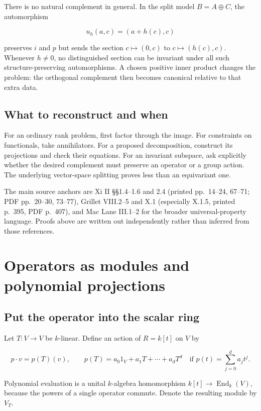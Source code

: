 \documentclass[
  11pt,
]{article}
\begin{document}
There is no natural complement in general. In the split model
\(B=A\oplus C\), the automorphism

\[u_h(a,c)=(a+h(c),c)\]

preserves \(i\) and \(p\) but sends the section \(c\mapsto(0,c)\) to
\(c\mapsto(h(c),c)\). Whenever \(h\ne0\), no distinguished section can
be invariant under all such structure-preserving automorphisms. A chosen
positive inner product changes the problem: the orthogonal complement
then becomes canonical relative to that extra data.

\subsection{What to reconstruct and
when}\label{what-to-reconstruct-and-when}

For an ordinary rank problem, first factor through the image. For
constraints on functionals, take annihilators. For a proposed
decomposition, construct its projections and check their equations. For
an invariant subspace, ask explicitly whether the desired complement
must preserve an operator or a group action. The underlying vector-space
splitting proves less than an equivariant one.

The main source anchors are Xi II §§1.4--1.6 and 2.4 (printed
pp.~14--24, 67--71; PDF pp.~20--30, 73--77), Grillet VIII.2--5 and X.1
(especially X.1.5, printed p.~395, PDF p.~407), and Mac Lane III.1--2
for the broader universal-property language. Proofs above are written
out independently rather than inferred from those references.

\section{Operators as modules and polynomial
projections}\label{operators-as-modules-and-polynomial-projections}

\subsection{Put the operator into the scalar
ring}\label{put-the-operator-into-the-scalar-ring}

Let \(T:V\to V\) be \(k\)-linear. Define an action of \(R=k[t]\) on
\(V\) by

\[p\cdot v=p(T)(v),\qquad
p(T)=a_0 1_V+a_1T+\cdots+a_dT^d
\quad\text{if }p(t)=\sum_{j=0}^d a_jt^j.\]

Polynomial evaluation is a unital \(k\)-algebra homomorphism
\(k[t]\to\operatorname{End}_k(V)\), because the powers of a single
operator commute. Denote the resulting module by \(V_T\).
\end{document}
